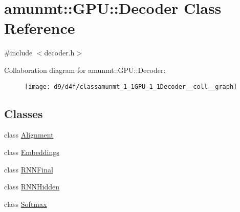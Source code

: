 \hypertarget{classamunmt_1_1GPU_1_1Decoder}{}\section{amunmt\+:\+:G\+PU\+:\+:Decoder Class Reference}
\label{classamunmt_1_1GPU_1_1Decoder}


{\ttfamily \#include $<$decoder.\+h$>$}



Collaboration diagram for amunmt\+:\+:G\+PU\+:\+:Decoder\+:
\nopagebreak
\begin{figure}[H]
\begin{center}
\leavevmode
\texttt{[image: d9/d4f/classamunmt\_1\_1GPU\_1\_1Decoder\_\_coll\_\_graph]}
\end{center}
\end{figure}
\subsection*{Classes}
\begin{DoxyCompactItemize}
\item 
class \hyperlink{classamunmt_1_1GPU_1_1Decoder_1_1Alignment}{Alignment}
\item 
class \hyperlink{classamunmt_1_1GPU_1_1Decoder_1_1Embeddings}{Embeddings}
\item 
class \hyperlink{classamunmt_1_1GPU_1_1Decoder_1_1RNNFinal}{R\+N\+N\+Final}
\item 
class \hyperlink{classamunmt_1_1GPU_1_1Decoder_1_1RNNHidden}{R\+N\+N\+Hidden}
\item 
class \hyperlink{classamunmt_1_1GPU_1_1Decoder_1_1Softmax}{Softmax}
\end{DoxyCompactItemize}
